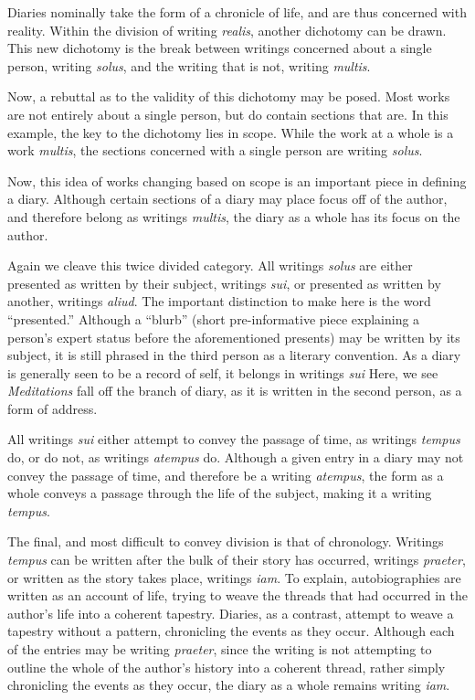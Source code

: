 \documentclass[12pt]{article}[titlepage]
\newcommand{\say}[1]{``#1''}
\newcommand{\1}{\={a}}
\newcommand{\2}{\={e}}
\newcommand{\3}{\={\i}}
\newcommand{\4}{\=o}
\newcommand{\5}{\=u}
\newcommand{\6}{\={A}}
\renewcommand{\,}{\textsuperscript{,}}
\begin{document}
Diaries nominally take the form of a chronicle of life, and are thus concerned with reality.
Within the division of writing \textit{realis}, another dichotomy can be drawn.
This new dichotomy is the break between writings concerned about a single person, writing \textit{solus}, and the writing that is not, writing \textit{multis}.

Now, a rebuttal as to the validity of this dichotomy may be posed.
Most works are not entirely about a single person, but do contain sections that are.
In this example, the key to the dichotomy lies in scope.
While the work at a whole is a work \textit{multis}, the sections concerned with a single person are writing \textit{solus}.

Now, this idea of works changing based on scope is an important piece in defining a diary.
Although certain sections of a diary may place focus off of the author, and therefore belong as writings \textit{multis}, the diary as a whole has its focus on the author.

Again we cleave this twice divided category.
All writings \textit{solus} are either presented as written by their subject, writings \textit{sui}, or presented as written by another, writings \textit{aliud}.
The important distinction to make here is the word \say{presented.}
Although a \say{blurb} (short pre-informative piece explaining a person's expert status before the aforementioned presents) may be written by its subject, it is still phrased in the third person as a literary convention.
As a diary is generally seen to be a record of self, it belongs in writings \textit{sui}
Here, we see \textit{Meditations} fall off the branch of diary, as it is written in the second person, as a form of address. 

All writings \textit{sui} either attempt to convey the passage of time, as writings \textit{tempus} do, or do not, as writings \textit{atempus} do.
Although a given entry in a diary may not convey the passage of time, and therefore be a writing \textit{atempus}, the form as a whole conveys a passage through the life of the subject, making it a writing \textit{tempus}.

The final, and most difficult to convey division is that of chronology.
Writings \textit{tempus} can be written after the bulk of their story has occurred, writings \textit{praeter}, or written as the story takes place, writings \textit{iam}.
To explain, autobiographies are written as an account of life, trying to weave the threads that had occurred in the author's life into a coherent tapestry.
Diaries, as a contrast, attempt to weave a tapestry without a pattern, chronicling the events as they occur.
Although each of the entries may be writing \textit{praeter}, since the writing is not attempting to outline the whole of the author's history into a coherent thread, rather simply chronicling the events as they occur, the diary as a whole remains writing \textit{iam}.
\end{document}
